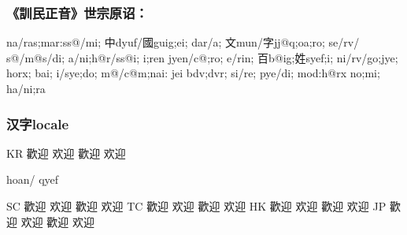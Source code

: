 \documentclass{article}
\begin{document}
\subsubsection*{《訓民正音》世宗原诏：}

\begin{korean}
 \begin{jamotext}
    na/ras;mar:ss@/mi;
    中dyuf/國guig;ei; dar/a;
    文mun/字jj@q;oa;ro; se/rv/ s@/m@s/di; a/ni;h@r/ss@i;
    i;ren jyen/c@;ro; e/rin; 百b@ig;姓syef;i;
    ni/rv/go;jye; horx; bai; i/sye;do;
    m@/c@m;nai: jei bdv;dvr; si/re; pye/di; mod:h@rx no;mi; ha/ni;ra
  \end{jamotext}
\end{korean}

\subsubsection*{汉字locale}
KR {\serifcjkkr 歡迎 欢迎} {\sanscjkkr 歡迎 欢迎} 
  \begin{korean}
    \begin{jamotext}
      hoan/ qyef
    \end{jamotext}
  \end{korean}\newline
SC {\serifcjksc 歡迎 欢迎} {\sanscjksc 歡迎 欢迎}\newline
TC {\serifcjktc 歡迎 欢迎} {\sanscjktc 歡迎 欢迎}\newline
HK {\serifcjkhk 歡迎 欢迎} {\sanscjkhk 歡迎 欢迎}\newline
JP {\serifcjkjp 歡迎 欢迎} {\sanscjkjp 歡迎 欢迎}\newline
\end{document}
